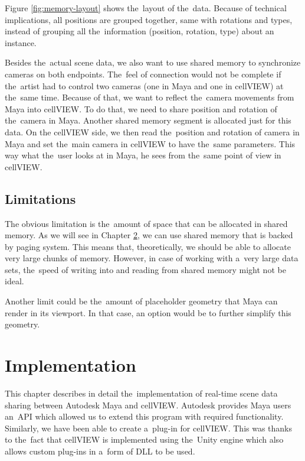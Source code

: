 \documentclass[
  digital, %
  table,   %
  nolof,     %
  nolot,     %
  oneside,
]{fithesis3}
\begin{document}
Figure \ref{fig:memory-layout} shows the layout of the data. Because of technical implications, all positions are grouped together, same with rotations and types, instead of grouping all the information (position, rotation, type) about an instance.

Besides the actual scene data, we also want to use shared memory to synchronize cameras on both endpoints. The feel of connection would not be complete if the artist had to control two cameras (one in Maya and one in cellVIEW) at the same time. Because of that, we want to reflect the camera movements from Maya into cellVIEW. To do that, we need to share position and rotation of the camera in Maya. Another shared memory segment is allocated just for this data. On the cellVIEW side, we then read the position and rotation of camera in Maya and set the main camera in cellVIEW to have the same parameters. This way what the user looks at in Maya, he sees from the same point of view in cellVIEW.

\section{Limitations}
The obvious limitation is the amount of space that can be allocated in shared memory. As we will see in Chapter \ref{chap:implementation}, we can use shared memory that is backed by paging system. This means that, theoretically, we should be able to allocate very large chunks of memory. However, in case of working with a very large data sets, the speed of writing into and reading from shared memory might not be ideal.

Another limit could be the amount of placeholder geometry that Maya can render in its viewport. In that case, an option would be to further simplify this geometry.

\chapter{Implementation}
\label{chap:implementation}
This chapter describes in detail the implementation of real-time scene data sharing between Autodesk Maya and cellVIEW. Autodesk provides Maya users an API which allowed us to extend this program with required functionality. Similarly, we have been able to create a plug-in for cellVIEW. This was thanks to the fact that cellVIEW is implemented using the Unity engine which also allows custom plug-ins in a form of DLL to be used.
\end{document}

